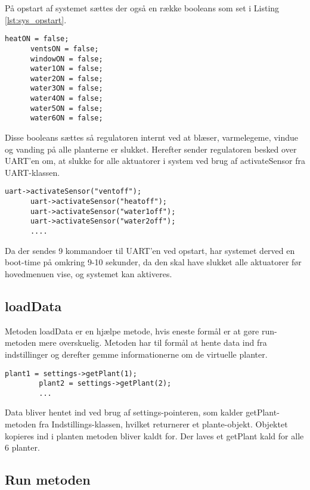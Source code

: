 På opstart af systemet sættes der også en række booleans som set i Listing \ref{lst:sys_opstart}.

\begin{lstlisting}[caption=Oprettelse af booleans ved system opstart, label=lst:sys_opstart]
      heatON = false;
      ventsON = false;
      windowON = false;
      water1ON = false;
      water2ON = false;
      water3ON = false;
      water4ON = false;
      water5ON = false;
      water6ON = false;
\end{lstlisting}

Disse booleans sættes så regulatoren internt ved at blæser, varmelegeme, vindue og vanding på alle planterne er slukket. Herefter sender regulatoren besked over UART'en om, at slukke for alle aktuatorer i system ved brug af activateSensor fra UART-klassen.

\begin{lstlisting}[caption=Anvendelse af UART-klassens activateSensor, label=lst:fra]
		uart->activateSensor("ventoff");
      uart->activateSensor("heatoff");
      uart->activateSensor("water1off");
      uart->activateSensor("water2off");
      ....
\end{lstlisting}

Da der sendes 9 kommandoer til UART'en ved opstart, har systemet derved en boot-time på omkring 9-10 sekunder, da den skal have slukket alle aktuatorer før hovedmenuen vise, og systemet kan aktiveres.

\subsection{loadData} 

Metoden loadData er en hjælpe metode, hvis eneste formål er at gøre run-metoden mere overskuelig. Metoden har til formål at hente data ind fra indstillinger og derefter gemme informationerne om de virtuelle planter.

\begin{lstlisting}[caption=Implementering af loadData., label=lst:loadData]
		plant1 = settings->getPlant(1);
		plant2 = settings->getPlant(2);	
		...
\end{lstlisting}

Data bliver hentet ind ved brug af settings-pointeren, som kalder getPlant-metoden fra Indstillings-klassen, hvilket returnerer et plante-objekt. Objektet kopieres ind i planten metoden bliver kaldt for. Der laves et getPlant kald for alle 6 planter.

\subsection{Run metoden} 

